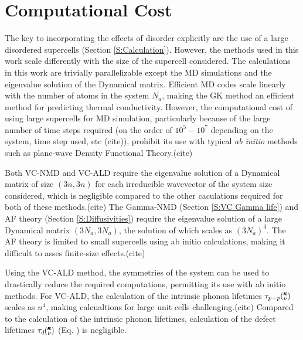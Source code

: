 \documentclass[aps,prb,twocolumn,superscriptaddress,amsmath,amssymb,floatfix]{revtex4}
\newcommand{\kv}{\mspace{-4.0mu}\left(\mspace{-8.0mu}
\begin{smallmatrix}&\pmb{\kappa} \\&\nu\end{smallmatrix}
\mspace{-3.0mu}\right)}
\begin{document}
\appendix

\section{\label{A:Computational Cost}
Computational Cost}

The key to incorporating the effects of disorder explicitly are the use 
of a large disordered supercells (Section \ref{S:Calculation}). 
However, the methods used 
in this work scale differently with the size of the supercell considered. 
The calculations in this work are trivially parallelizable\cite{} 
except the 
MD simulations\cite{plimpton_fast_1995} and the eigenvalue solution of the 
Dynamical matrix.\cite{gale_general_2003} Efficient MD 
codes scale linearly with the number of atoms in the system $N_a$, making 
the GK method an efficient method for predicting thermal conductivity. 
However, the computational cost of using large supercells for MD simulation, 
particularly because of the large number of time steps required 
(on the order of $10^5 - 10^7$ depending on the 
system, time step used, etc (cite)), prohibit its use with typical 
\emph{ab initio} methods such as 
plane-wave Density Functional Theory.(cite) 

Both VC-NMD and VC-ALD require the eigenvalue solution 
of a Dynamical matrix of size $(3n,3n)$ for each irreducible wavevector 
of the system size considered, 
which is negligible compared to the other 
caculations required for both of these methods.(cite) 
The Gamma-NMD (Section \ref{S:VC Gamma life}) and 
AF theory (Section \ref{S:Diffusivities}) 
require the eigenvalue solution of a large Dynamical matrix $(3N_a,3N_a)$, 
the solution of which scales as $(3N_a)^3$. 
The AF theory is limited 
to small supercells using ab initio calculations, making it difficult 
to asses finite-size effects.(cite)  

Using the VC-ALD method, the symmetries of the system can be 
used to drastically reduce the required computations, permitting its 
use with ab initio methods.
\cite{esfarjani_method_2008,turney_predicting_2009,
esfarjani_heat_2011,chaput_phonon-phonon_2011} 
For VC-ALD, the calculation of the intrinsic phonon 
lifetimes $\tau_{p-p}\kv$ scales as $n^4$,\cite{turney_predicting_2009}  
making calcualtions for large unit cells challenging.(cite) 
Compared to 
the calculation of the intrinsic phonon lifetimes, calculation 
of the defect lifetimes $\tau_d\kv$ (Eq. ) is negligible.
\end{document}
